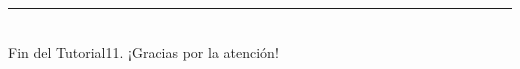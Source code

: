 \documentclass[10pt,a4paper]{article}\usepackage[]{graphicx}\usepackage[]{color}
\newcounter {cont01}
\begin{document}
%
%
%
%
%
%
%
%
%
%
%
%
%
%



\vspace{2cm} \hrule
\quad\\
Fin del Tutorial11. ¡Gracias por la atención!

%
\end{document}
